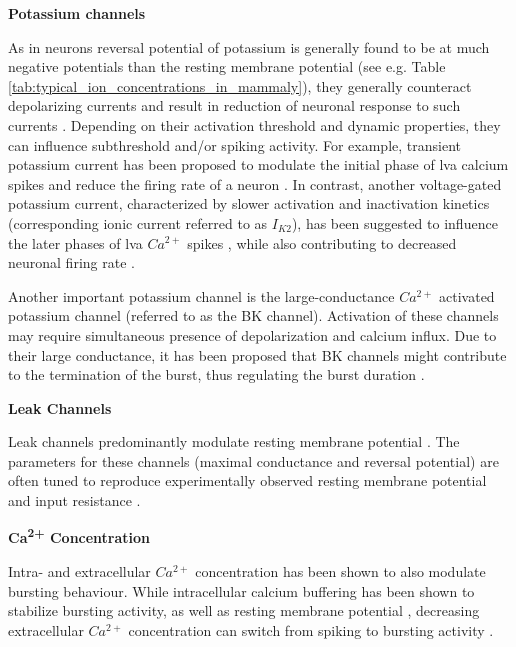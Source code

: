 \documentclass[../main.tex]{subfiles}
\begin{document}
\noindent\textbf{Potassium channels}

As in neurons reversal potential of potassium is generally found to be at much negative potentials than the resting membrane potential (see e.g. Table \ref{tab:typical_ion_concentrations_in_mammaly}), they generally counteract depolarizing currents and result in reduction of neuronal response to such currents \cite{mccormickModelElectrophysiologicalProperties1992}. Depending on their activation threshold and dynamic properties, they can influence subthreshold and/or spiking activity. For example, transient potassium current has been proposed to modulate the initial phase of \gls{lva} calcium spikes \cite{huguenardSimulationCurrentsInvolved1992} and reduce the firing rate of a neuron \cite{mccormickModelElectrophysiologicalProperties1992}. In contrast, another voltage-gated potassium current, characterized by slower activation and inactivation kinetics (corresponding ionic current referred to as $I_{K2}$), has been suggested to influence the later phases of \gls{lva} $Ca^{2+}$ spikes \cite{huguenardSimulationCurrentsInvolved1992}, while also contributing to decreased neuronal firing rate \cite{mccormickModelElectrophysiologicalProperties1992}.

Another important potassium channel is the large-conductance $Ca^{2+}$ activated potassium channel (referred to as the BK channel). Activation of these channels may require simultaneous presence of depolarization and calcium influx. Due to their large conductance, it has been proposed that BK channels might contribute to the termination of the burst, thus regulating the burst
duration \cite{liuMultipleConductancesCooperatively2008}.

\noindent\textbf{Leak Channels}

Leak channels predominantly modulate resting membrane potential \cite{mccormickModelElectrophysiologicalProperties1992,amarilloInterplaySevenSubthreshold2014}. The parameters for these channels (maximal conductance and reversal potential) are often tuned to reproduce experimentally observed resting membrane potential and input resistance \cite{wangMultipleDynamicalModes1994}.

\noindent \textbf{Ca\textsuperscript{2+} Concentration}

Intra- and extracellular $Ca^{2+}$ concentration has been shown to also modulate bursting behaviour. While intracellular calcium buffering has been shown to stabilize bursting activity, as well as resting membrane potential \cite{liuMultipleConductancesCooperatively2008}, decreasing extracellular $Ca^{2+}$ concentration can switch from spiking to bursting activity \cite{golombContributionPersistentNa2006}.
\end{document}
